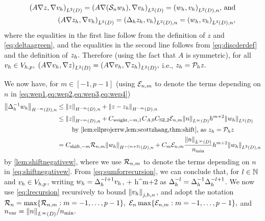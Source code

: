 \begin{align*}
\IPLtD{A \grad z}{\grad \vh} = \IPLtD{A \grad \mleft(\sdsol \wh\mright)}{\grad \vh} = \IPLtDn{\wh}{\vh} \text{, and}\\
\IPLtD{A \grad \zh}{\grad \vh} = \IPLtDn{\Deltah \zh}{\vh} = \IPLtDn{\wh}{\vh},
\end{align*}
where the equalities in the first line follow from the definition of $z$ and \cref{eq:deltaagreen}, and the equalities in the second line follows from \cref{eq:discderdef} and the definition of $z_{h}.$  Therefore (using the fact that $A$ is symmetric), for all $v_{h} \in V_{h,p},$ $\IPLtD{A\grad \vh}{\grad z} = \IPLtD{A\grad \vh}{\grad \zh},$ i.e., $z_{h} = \mathcal P_{h} z.$

We now have, for $m \in [-1,p-1]$ (using $\mathcal E_{n,m}$ to denote the terms depending on $n$ in \cref{eq:wep1,eq:wep2,eq:wep3,eq:wep4})
\begin{align}
\NHnfn{-m}{D}{\DeltahI \wh} &\leq \NHnfn{-m}{D}{z} + \NHnfn{-m}{D}{z-\zh}\nonumber\\
&\leq \NHnfn{-m}{D}{z} + \Cwfn{-m,1}  \CAfn{0} \CSZfn{2} \errn{m} \NLiD{n} h^{m+2} \NLtD{\wh}\nonumber\\
&\quad\quad\text{ by \cref{lem:ellprojerrw,lem:scottzhang,thm:shift}, as }\zh = \Ph z\nonumber\\
&= \Cshiftfn{m} \shiftn{m} \NHnfn{-(m+2)}{D}{\wh} + \Cm \errn{m} \frac{\NLiD{n}}{\nmin} h^{m+2} \NLtDn{\wh}\label{eq:sumforrecursion}
\end{align}
by \cref{lem:shiftnegativew}, where we use $\mathcal R_{n,m}$ to denote the terms depending on $n$ in \cref{eq:shiftnegativew}.
From \cref{eq:sumforrecursion}, we can conclude that, for $l \in \mathbb N$ and $v_{h} \in V_{h,p}$, writing $w_{h} = \Delta_{h}^{-l+1} v_{h}$,
\beq\label{eq:lrecursion}
 \leq {}  + \Cm {}  h^{m+2} \NLtDn{\Deltahmlpo \vh}
\eeq
as $\Delta_{h}^{-l} = \Delta_{h}^{-1} \Delta_{h}^{-l+1}$. We now use \cref{eq:lrecursion} recursively to bound $\Nfn{j,h,n}{\vh}$, and adopt the notation $\Rn = \max\set{\shiftn{m}\st m = -1,\ldots,p-1},$ $\En\max\set{\errn{m}\st m = -1,\ldots,p-1},$ and $\nvar = \NLiD{n}/\nmin.$

